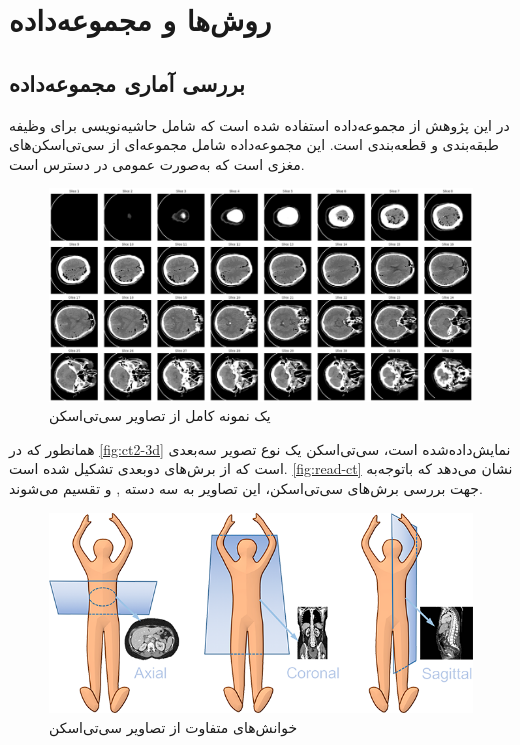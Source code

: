 \chapter{روش‌ها و مجموعه‌داده}
\label{dataset}
\section{بررسی آماری مجموعه‌داده}

در این پژوهش از مجموعه‌داده
\cite{physionet_hssayeni2020intracranial,hssayeni2020computed}
استفاده شده است که شامل حاشیه‌نویسی برای وظیفه طبقه‌بندی و قطعه‌بندی است. این مجموعه‌داده  شامل مجموعه‌ای از سی‌تی‌اسکن‌های مغزی است که به‌صورت عمومی در دسترس است.
\begin{figure}[h]
\centering
\includegraphics[width=1.0\linewidth]{Images/Chapter2/3d}
\caption{یک نمونه کامل از تصاویر سی‌تی‌اسکن}
\label{fig:ct2-3d}
\end{figure}


همانطور که در 
\autoref{fig:ct2-3d}
نمایش‌داده‌شده است، سی‌تی‌اسکن یک نوع تصویر سه‌بعدی است که از برش‌های دوبعدی تشکیل شده است. 
\autoref{fig:read-ct}
 نشان می‌دهد که
 باتوجه‌‌به جهت بررسی برش‌های سی‌تی‌اسکن، این تصاویر به سه دسته 
 ,  و 
 تقسیم می‌شوند.
\begin{figure}[h]
\centering
\includegraphics[width=1.0\linewidth]{"Images/Chapter2/read CT"}
\caption{خوانش‌های متفاوت از تصاویر سی‌تی‌اسکن
\cite{kaggleCTScansDICOM}}
\label{fig:read-ct}
\end{figure}
 
